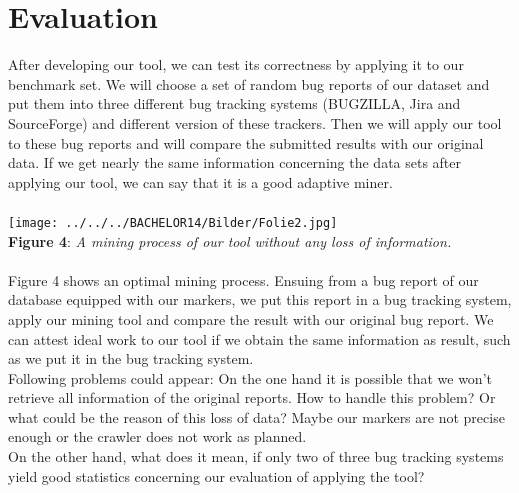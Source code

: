 \documentclass[12pt,a4paper,final]{article}
\begin{document}
\section{Evaluation}
After developing our tool, we can test its correctness by applying it to our benchmark set. We will choose a set of random bug reports of our dataset and put them into three different bug tracking systems (BUGZILLA, Jira and SourceForge) and different version of these trackers. Then we will apply our tool to these bug reports and will compare the submitted results with our original data. If we get nearly the same information concerning the data sets after applying our tool, we can say that it is a good adaptive miner. \\ \\\texttt{[image: ../../../BACHELOR14/Bilder/Folie2.jpg]}  \\\textbf{Figure 4}: \textit{A mining process of our tool without any loss of information.}  \\ \\
Figure 4 shows an optimal mining process. Ensuing from a bug report of our database equipped with our markers, we put this report in a bug tracking system, apply our mining tool and compare the result with our original bug report. We can attest ideal work to our tool if we obtain the same information as result, such as we put it in the bug tracking system. \\ Following problems could appear: On the one hand it is possible that we won't retrieve all information of the original reports. How to handle this problem? Or what could be the reason of this loss of data? Maybe our markers are not precise enough or the crawler does not work as planned. \\ On the other hand, what does it mean, if only two of three bug tracking systems yield good statistics concerning our evaluation of applying the tool?
\end{document}
